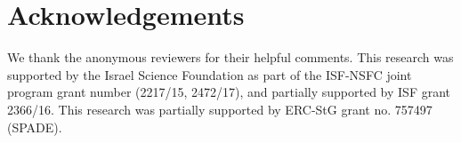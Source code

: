 \documentclass[acmtog,timestamp]{acmart}%
\begin{document}
\section{Acknowledgements}
We thank the anonymous reviewers for their helpful comments. This research was supported by the Israel Science Foundation as part of the ISF-NSFC joint program grant number (2217/15, 2472/17), and partially supported by ISF grant 2366/16. This research was partially supported by ERC-StG grant no. 757497 (SPADE).








\end{document}
